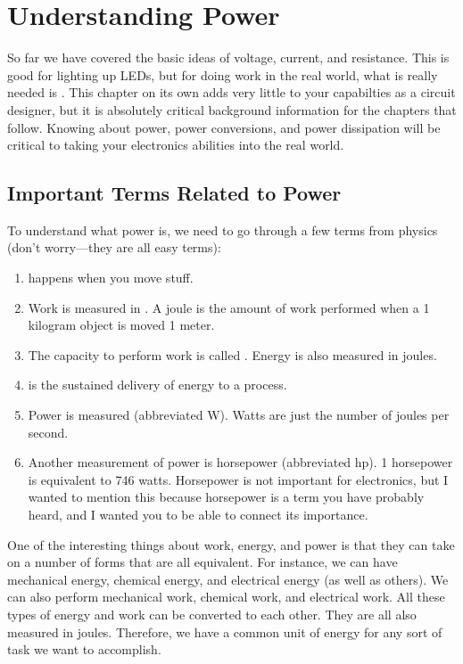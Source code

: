 \chapter{Understanding Power}

So far we have covered the basic ideas of voltage, current, and resistance.
This is good for lighting up LEDs, but for doing work in the real world, what is really needed is .
This chapter on its own adds very little to your capabilties as a circuit designer, but it is absolutely critical background information for the chapters that follow.
Knowing about power, power conversions, and power dissipation will be critical to taking your electronics abilities into the real world.

\section{Important Terms Related to Power}

To understand what power is, we need to go through a few terms from physics (don't worry---they are all easy terms):

\begin{enumerate}
\item {} happens when you move stuff.  
\item Work is measured in . A joule is the amount of work performed when a 1 kilogram object is moved 1 meter.
\item The capacity to perform work is called .  Energy is also measured in joules.
\item {} is the sustained delivery of energy to a process.  
\item Power is measured  (abbreviated W).  Watts are just the number of joules per second.
\item Another measurement of power is horsepower (abbreviated hp).  1 horsepower is equivalent to 746 watts.  Horsepower is not important for electronics, but I wanted to mention this because horsepower is a term you have probably heard, and I wanted you to be able to connect its importance.
\end{enumerate}

One of the interesting things about work, energy, and power is that they can take on a number of forms that are all equivalent.
For instance, we can have mechanical energy, chemical energy, and electrical energy (as well as others).
We can also perform mechanical work, chemical work, and electrical work.
All these types of energy and work can be converted to each other.
They are all also measured in joules.
Therefore, we have a common unit of energy for any sort of task we want to accomplish.

